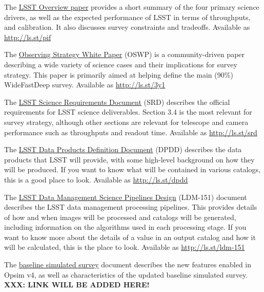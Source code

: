 \documentclass[DM,lsstdraft,toc,usenatbib]{lsstdoc}
\begin{document}
The \href{https://www.lsst.org/content/lsst-science-drivers-reference-design-and-anticipated-data-products}{LSST Overview paper} provides a short summary of the four primary science drivers, as well as the expected performance of LSST in terms of throughputs, and calibration. 
It also discusses survey constraints and tradeoffs.  Available as \url{http://ls.st/pif}

The \href{https://github.com/LSSTScienceCollaborations/ObservingStrategy}{Observing Strategy White Paper}  (OSWP) is a community-driven paper describing a wide variety of science cases and their implications for survey strategy. This paper is primarily aimed at helping define the main (90\%) WideFastDeep survey. Available as \url{http://ls.st/3y1}

The \href{http:/ls.st/srd}{LSST Science Requirements Document} (SRD) describes the official requirements for LSST science deliverables. Section 3.4 is the most relevant for survey strategy, although other sections are relevant for telescope and camera performance such as throughputs and readout time. Available as \url{http://ls.st/srd}

The \href{http://ls.st/dpdd}{LSST Data Products Definition Document} (DPDD) describes the data products that LSST will provide, with some high-level background on how they will be produced. If you want to know what will be contained in various catalogs, this is a good place to look. Available as \url{http://ls.st/dpdd}

The \href{http://ls.st/ldm-151}{LSST Data Management Science Pipelines Design} (LDM-151) document describes the LSST data management processing pipelines. This provides details of how and when images will be processed and catalogs will be generated, including information on the algorithms used in each processing stage. If you want to know more about the details of a value in an output catalog and how it will be calculated, this is the place to look. Available as \url{http://ls.st/ldm-151}


The \href{https://github.com/lsst-pst/survey_strategy/blob/master/db/baseline-doc/baseline.pdf}{baseline simulated survey} document describes the new features enabled in Opsim v4, as well as characteristics of the updated baseline simulated survey. 
{\bf XXX: LINK WILL BE ADDED HERE!}
\end{document}
